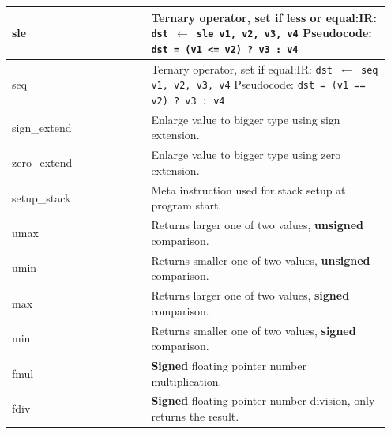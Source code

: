 \documentclass[course=eragp]{aspdoc}
\begin{document}
\begin{center}
\begin{longtable}{p{0.35\linewidth} | p{0.6\linewidth}}
        \hline
        sle          & Ternary operator, set if less or equal:\newline IR: \texttt{dst $\leftarrow$ sle v1, v2, v3, v4} \newline
        Pseudocode: \texttt{dst = (v1 <= v2) ? v3 : v4}                                                                                           \\
        \hline
        seq          & Ternary operator, set if equal:\newline IR: \texttt{dst $\leftarrow$ seq v1, v2, v3, v4} \newline
        Pseudocode: \texttt{dst = (v1 == v2) ? v3 : v4}                                                                                           \\
        \hline
        sign\_extend & Enlarge value to bigger type using sign extension.                                                                         \\
        \hline
        zero\_extend & Enlarge value to bigger type using zero extension.                                                                         \\
        \hline
        setup\_stack & Meta instruction used for stack setup at program start.                                                                    \\
        \hline
        umax         & Returns larger one of two values, \textbf{unsigned} comparison.                                                            \\
        \hline
        umin         & Returns smaller one of two values, \textbf{unsigned} comparison.                                                           \\
        \hline
        max          & Returns larger one of two values, \textbf{signed} comparison.                                                              \\
        \hline
        min          & Returns smaller one of two values, \textbf{signed} comparison.                                                             \\
        \hline
        fmul         & \textbf{Signed} floating pointer number multiplication.                                                                    \\
        \hline
        fdiv         & \textbf{Signed} floating pointer number division, only returns the result.                                                 \\

\end{longtable}
\end{center}
\end{document}
